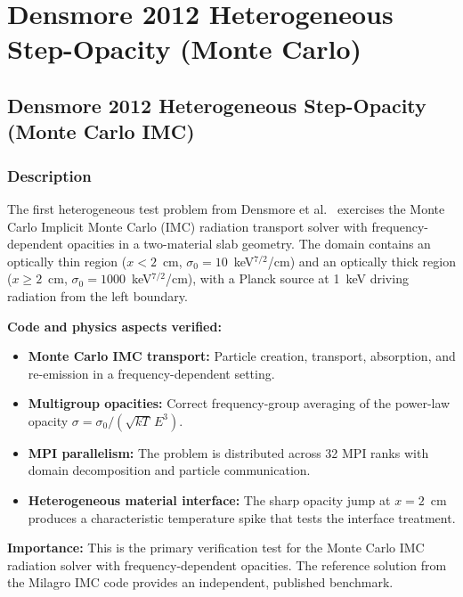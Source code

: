 \documentclass[11pt,a4paper]{article}
\begin{document}
\newpage

\section{Densmore 2012 Heterogeneous Step-Opacity (Monte Carlo)}
\label{sec:densmore}

\subsection{Densmore 2012 Heterogeneous Step-Opacity (Monte Carlo IMC)}
\label{sec:densmore2012_mc}

\subsubsection*{Description}
The first heterogeneous test problem from Densmore et al.\ \cite{densmore2012} exercises the Monte Carlo Implicit Monte Carlo (IMC) radiation transport solver with frequency-dependent opacities in a two-material slab geometry. The domain contains an optically thin region ($x < 2$~cm, $\sigma_0 = 10$~keV$^{7/2}$/cm) and an optically thick region ($x \ge 2$~cm, $\sigma_0 = 1000$~keV$^{7/2}$/cm), with a Planck source at 1~keV driving radiation from the left boundary.

\textbf{Code and physics aspects verified:}
\begin{itemize}
  \item \textbf{Monte Carlo IMC transport:} Particle creation, transport, absorption, and re-emission in a frequency-dependent setting.
  \item \textbf{Multigroup opacities:} Correct frequency-group averaging of the power-law opacity $\sigma = \sigma_0 / (\sqrt{kT}\,E^3)$.
  \item \textbf{MPI parallelism:} The problem is distributed across 32 MPI ranks with domain decomposition and particle communication.
  \item \textbf{Heterogeneous material interface:} The sharp opacity jump at $x = 2$~cm produces a characteristic temperature spike that tests the interface treatment.
\end{itemize}

\textbf{Importance:} This is the primary verification test for the Monte Carlo IMC radiation solver with frequency-dependent opacities. The reference solution from the Milagro IMC code \cite{densmore2012} provides an independent, published benchmark.
\end{document}
